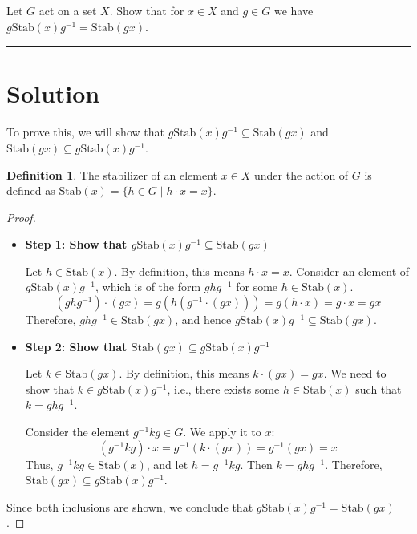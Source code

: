 \documentclass[12pt]{amsart}
\theoremstyle{definition}
\newtheorem{definition}[theorem]{Definition}
\numberwithin{equation}{section}
\begin{document}
\begin{exercise}{2} Let \(G\) act on a set \(X\). Show that for \(x\in X\) and \(g\in G\) we have \(g\text{Stab}(x)g^{-1}= \text{Stab}(gx)\).

    \noindent\rule{\linewidth}{1pt}

    \section*{Solution}
    
    To prove this, we will show that \(g\text{Stab}(x)g^{-1} \subseteq \text{Stab}(gx)\) and \(\text{Stab}(gx) \subseteq g\text{Stab}(x)g^{-1}\).

    \begin{definition}
        The stabilizer of an element \(x\in X\) under the action of \(G\) is defined as \(\text{Stab}(x) = \{h \in G \mid h \cdot x = x\}\).
    \end{definition}

    \begin{proof} \( \)
        \begin{itemize}
            \item \textbf{Step 1: Show that \(g\text{Stab}(x)g^{-1} \subseteq \text{Stab}(gx)\)}
            
            Let \(h \in \text{Stab}(x)\). By definition, this means \(h \cdot x = x\).
            Consider an element of \(g\text{Stab}(x)g^{-1}\), which is of the form \(ghg^{-1}\) for some \(h \in \text{Stab}(x)\).
            \[
            (ghg^{-1}) \cdot (gx) = g(h(g^{-1} \cdot (gx))) = g(h \cdot x) = g \cdot x = gx
            \]
            Therefore, \(ghg^{-1} \in \text{Stab}(gx)\), and hence \(g\text{Stab}(x)g^{-1} \subseteq \text{Stab}(gx)\).
            
            \item \textbf{Step 2: Show that \(\text{Stab}(gx) \subseteq g\text{Stab}(x)g^{-1}\)}
            
            Let \(k \in \text{Stab}(gx)\). By definition, this means \(k \cdot (gx) = gx\).
            We need to show that \(k \in g\text{Stab}(x)g^{-1}\), i.e., there exists some \(h \in \text{Stab}(x)\) such that \(k = ghg^{-1}\).
            
            Consider the element \(g^{-1}kg \in G\). We apply it to \(x\):
            \[
            (g^{-1}kg) \cdot x = g^{-1}(k \cdot (gx)) = g^{-1}(gx) = x
            \]
            Thus, \(g^{-1}kg \in \text{Stab}(x)\), and let \(h = g^{-1}kg\). Then \(k = ghg^{-1}\).
            Therefore, \(\text{Stab}(gx) \subseteq g\text{Stab}(x)g^{-1}\).
        \end{itemize}
        
        Since both inclusions are shown, we conclude that \(g\text{Stab}(x)g^{-1} = \text{Stab}(gx)\).
    \end{proof}
\end{exercise}
\newpage
\end{document}
